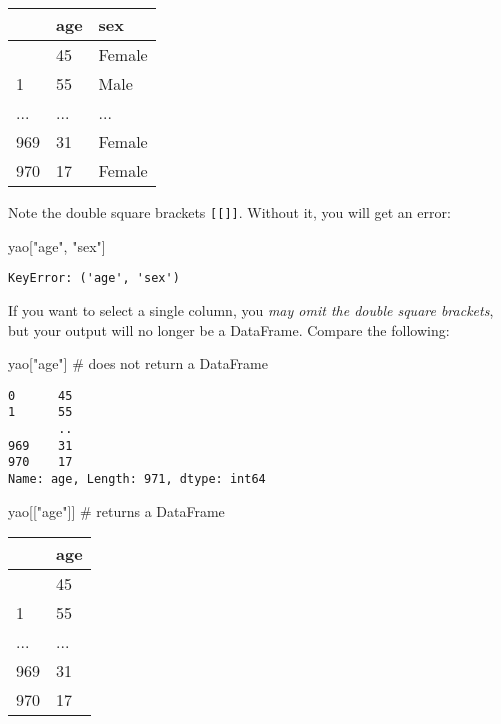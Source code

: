 \documentclass[
  letterpaper,
  DIV=11,
  numbers=noendperiod]{scrreprt}
\newenvironment{Shaded}{\begin{snugshade}}{\end{snugshade}}
\newcommand{\CommentTok}[1]{\textcolor[rgb]{0.37,0.37,0.37}{#1}}
\newcommand{\NormalTok}[1]{\textcolor[rgb]{0.00,0.23,0.31}{#1}}
\newcommand{\StringTok}[1]{\textcolor[rgb]{0.13,0.47,0.30}{#1}}
\begin{document}
\begin{longtable}[]{@{}lll@{}}
\toprule\noalign{}
& age & sex \\
\midrule\noalign{}
\endhead
\bottomrule\noalign{}
\endlastfoot
0 & 45 & Female \\
1 & 55 & Male \\
... & ... & ... \\
969 & 31 & Female \\
970 & 17 & Female \\
\end{longtable}

Note the double square brackets \texttt{{[}{[}{]}{]}}. Without it, you
will get an error:

\begin{Shaded}
\begin{Highlighting}[]
\NormalTok{yao[}\StringTok{"age"}\NormalTok{, }\StringTok{"sex"}\NormalTok{]}
\end{Highlighting}
\end{Shaded}

\begin{verbatim}
KeyError: ('age', 'sex')
\end{verbatim}

If you want to select a single column, you \emph{may omit the double
square brackets}, but your output will no longer be a DataFrame. Compare
the following:

\begin{Shaded}
\begin{Highlighting}[]
\NormalTok{yao[}\StringTok{"age"}\NormalTok{] }\CommentTok{\# does not return a DataFrame}
\end{Highlighting}
\end{Shaded}

\begin{verbatim}
0      45
1      55
       ..
969    31
970    17
Name: age, Length: 971, dtype: int64
\end{verbatim}

\begin{Shaded}
\begin{Highlighting}[]
\NormalTok{yao[[}\StringTok{"age"}\NormalTok{]]  }\CommentTok{\# returns a DataFrame}
\end{Highlighting}
\end{Shaded}

\begin{longtable}[]{@{}ll@{}}
\toprule\noalign{}
& age \\
\midrule\noalign{}
\endhead
\bottomrule\noalign{}
\endlastfoot
0 & 45 \\
1 & 55 \\
... & ... \\
969 & 31 \\
970 & 17 \\
\end{longtable}
\end{document}

